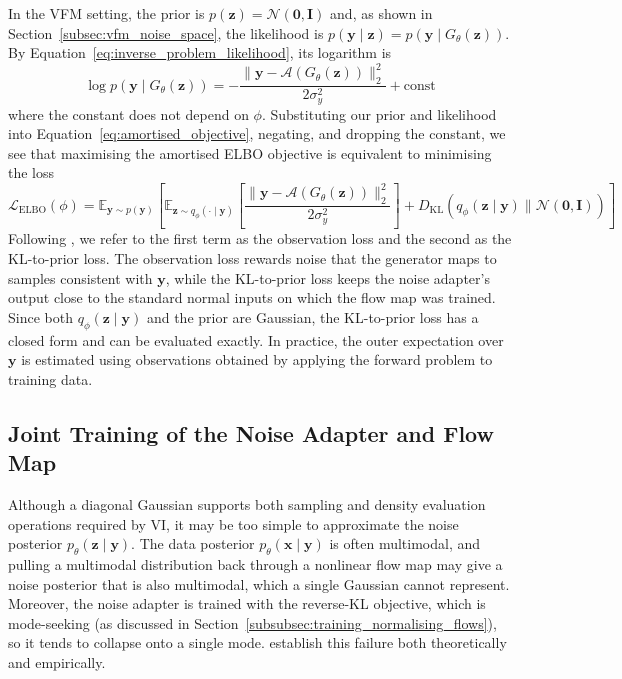 \documentclass[12pt,a4paper]{report}
\begin{document}
In the VFM setting, the prior is $p(\mathbf{z})=\mathcal{N}(\mathbf{0},\mathbf{I})$ and, as shown in Section~\ref{subsec:vfm_noise_space}, the likelihood is $p(\mathbf{y}\mid\mathbf{z})=p(\mathbf{y}\mid G_{\theta}(\mathbf{z}))$. By Equation~\ref{eq:inverse_problem_likelihood}, its logarithm is
\begin{equation}
\log p(\mathbf{y}\mid G_{\theta}(\mathbf{z}))
=
-\frac{\lVert\mathbf{y}-\mathcal{A}(G_{\theta}(\mathbf{z}))\rVert_2^2}{2\sigma_y^2}
+\mathrm{const}
\label{eq:vfm_log_likelihood}
\end{equation}
where the constant does not depend on $\phi$. Substituting our prior and likelihood into Equation~\ref{eq:amortised_objective}, negating, and dropping the constant, we see that maximising the amortised ELBO objective is equivalent to minimising the loss
\begin{equation}
\mathcal{L}_{\mathrm{ELBO}}(\phi)
=
\mathbb{E}_{\mathbf{y}\sim p(\mathbf{y})}
\left[
\mathbb{E}_{\mathbf{z}\sim q_{\phi}(\cdot\mid\mathbf{y})}
\left[
\frac{\lVert\mathbf{y}-\mathcal{A}(G_{\theta}(\mathbf{z}))\rVert_2^2}{2\sigma_y^2}
\right]
+
D_{\mathrm{KL}}\left(q_{\phi}(\mathbf{z}\mid\mathbf{y})\parallel\mathcal{N}(\mathbf{0},\mathbf{I})\right)
\right]
\label{eq:vfm_elbo_loss}
\end{equation}
Following \textcite{VFM}, we refer to the first term as the observation loss and the second as the KL-to-prior loss. 
The observation loss rewards noise that the generator maps to samples consistent with $\mathbf{y}$, while the KL-to-prior loss keeps the noise adapter's output close to the standard normal inputs on which the flow map was trained. Since both $q_{\phi}(\mathbf{z}\mid\mathbf{y})$ and the prior are Gaussian, the KL-to-prior loss has a closed form and can be evaluated exactly.
In practice, the outer expectation over $\mathbf{y}$ is estimated using observations obtained by applying the forward problem to training data.

\subsection{Joint Training of the Noise Adapter and Flow Map}
\label{subsec:vfm_joint_training}
Although a diagonal Gaussian supports both sampling and density evaluation operations required by VI, it may be too simple to approximate the noise posterior $p_{\theta}(\mathbf{z}\mid\mathbf{y})$. The data posterior $p_{\theta}(\mathbf{x}\mid\mathbf{y})$ is often multimodal, and pulling a multimodal distribution back through a nonlinear flow map may give a noise posterior that is also multimodal, which a single Gaussian cannot represent. Moreover, the noise adapter is trained with the reverse-KL objective, which is mode-seeking (as discussed in Section~\ref{subsubsec:training_normalising_flows}), so it tends to collapse onto a single mode. \textcite{VFM} establish this failure both theoretically and empirically. 
\end{document}
